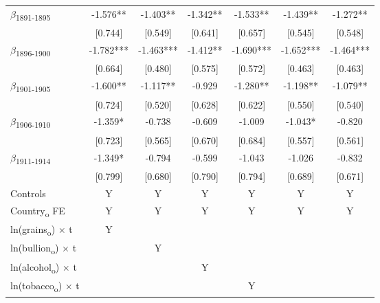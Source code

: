 {\begin{tabular}{l*{6}{c}}
$\beta$\textsubscript{1891-1895}&      -1.576** &      -1.403** &      -1.342** &      -1.533** &      -1.439** &      -1.272** \\
            &     [0.744]   &     [0.549]   &     [0.641]   &     [0.657]   &     [0.545]   &     [0.548]   \\
$\beta$\textsubscript{1896-1900}&      -1.782***&      -1.463***&      -1.412** &      -1.690***&      -1.652***&      -1.464***\\
            &     [0.664]   &     [0.480]   &     [0.575]   &     [0.572]   &     [0.463]   &     [0.463]   \\
$\beta$\textsubscript{1901-1905}&      -1.600** &      -1.117** &      -0.929   &      -1.280** &      -1.198** &      -1.079** \\
            &     [0.724]   &     [0.520]   &     [0.628]   &     [0.622]   &     [0.550]   &     [0.540]   \\
$\beta$\textsubscript{1906-1910}&      -1.359*  &      -0.738   &      -0.609   &      -1.009   &      -1.043*  &      -0.820   \\
            &     [0.723]   &     [0.565]   &     [0.670]   &     [0.684]   &     [0.557]   &     [0.561]   \\
$\beta$\textsubscript{1911-1914}&      -1.349*  &      -0.794   &      -0.599   &      -1.043   &      -1.026   &      -0.832   \\
            &     [0.799]   &     [0.680]   &     [0.790]   &     [0.794]   &     [0.689]   &     [0.671]   \\
Controls    &           Y   &           Y   &           Y   &           Y   &           Y   &           Y   \\
Country\textsubscript{o} FE&           Y   &           Y   &           Y   &           Y   &           Y   &           Y   \\
ln(grains\textsubscript{o}) $\times$ t&           Y   &               &               &               &               &               \\
ln(bullion\textsubscript{o}) $\times$ t&               &           Y   &               &               &               &               \\
ln(alcohol\textsubscript{o}) $\times$ t&               &               &           Y   &               &               &               \\
ln(tobacco\textsubscript{o}) $\times$ t&               &               &               &           Y   &               &               \\

\end{tabular}}

